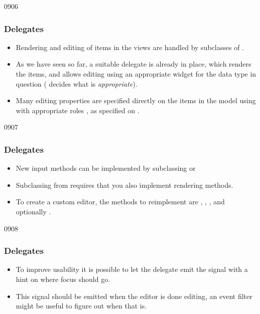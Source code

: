 \begin{slide}[fragile]{0906}\frametitle{Delegates}\label{model_view_delegates}
\begin{itemize}
\item Rendering and editing of items in the views are handled by subclasses
  of .
\item As we have seen so far, a suitable delegate is already in place,
  which renders the items, and allows editing using an appropriate widget
  for the data type in question ( decides what
  is \emph{appropriate}).
\item Many editing properties are specified directly on the items in the
  model using  with appropriate
  roles%
, as specified on .%
\end{itemize}
\end{slide}

\begin{slide}{0907}\frametitle{Delegates}
\begin{itemize}
\item New input methods can be implemented by subclassing
   or 
\item Subclassing from  requires that you
  also implement rendering methods.
\item To create a custom editor, the methods to reimplement are ,
  , , and optionally
  .
\end{itemize}
\end{slide}

\begin{slide}{0908}\frametitle{Delegates}
\begin{itemize}
\item To improve usability it is possible to let the delegate emit the
  signal  with a hint on where focus should go.
\item This signal should be emitted when the editor is done editing, an
  event filter might be useful to figure out when that is.
\end{itemize}
\end{slide}

